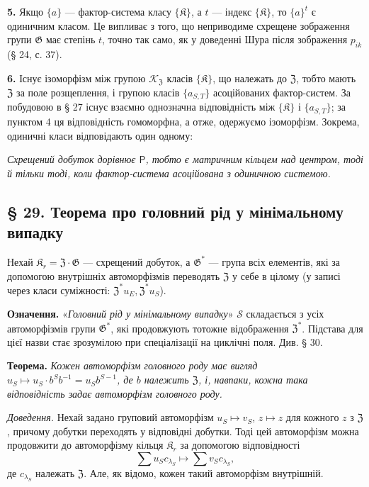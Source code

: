 \documentclass[11pt]{article}
\begin{document}
\noindent\textbf{5.} Якщо \(\{a\}\) --- фактор-система класу \(\{\mathfrak K\}\), а \(t\) --- індекс \(\{\mathfrak K\}\), то \(\{a\}^t\) є одиничним класом. Це випливає з того, що неприводиме схрещене зображення групи \(\mathfrak G\) має степінь \(t\), точно так само, як у доведенні Шура після зображення \(p_{ik}\) (§ 24, с. 37).

\noindent\textbf{6.} Існує ізоморфізм між групою \(\mathscr K_{\mathfrak Z}\) класів \(\{\mathfrak K\}\), що належать до \(\mathfrak Z\), тобто мають \(\mathfrak Z\) за поле розщеплення, і групою класів \(\{a_{S,T}\}\) асоційованих фактор-систем. За побудовою в § 27 існує взаємно однозначна відповідність між \(\{\mathfrak K\}\) і \(\{a_{S,T}\}\); за пунктом 4 ця відповідність гомоморфна, а отже, одержуємо ізоморфізм. Зокрема, одиничні класи відповідають один одному:

\noindent\emph{Схрещений добуток дорівнює \(\mathsf{P}\), тобто є матричним кільцем над центром, тоді й тільки тоді, коли фактор-система асоційована з одиничною системою.}

\subsection*{§ 29. Теорема про головний рід у мінімальному випадку}\label{hauptgeschlechtssatz-im-minimalen}

Нехай \(\mathfrak K_r=\mathfrak Z\cdot\mathfrak G\) --- схрещений добуток, а \(\mathfrak G^*\) --- група всіх елементів, які за допомогою внутрішніх автоморфізмів переводять \(\mathfrak Z\) у себе в цілому (у записі через класи суміжності: \(\mathfrak Z^*u_E,\mathfrak Z^*u_S\)).

\noindent\textbf{Означення.} «\emph{Головний рід у мінімальному випадку}» \(\mathscr S\) складається з усіх автоморфізмів групи \(\mathfrak G^*\), які продовжують тотожне відображення \(\mathfrak Z^*\). Підстава для цієї назви стає зрозумілою при спеціалізації на циклічні поля. Див. § 30.

\noindent\textbf{Теорема.} \emph{Кожен автоморфізм головного роду має вигляд \(u_S\mapsto u_S\cdot b^Sb^{-1}=u_Sb^{S-1}\), де \(b\) належить \(\mathfrak Z\), і, навпаки, кожна така відповідність задає автоморфізм головного роду.}

\noindent\emph{Доведення.} Нехай задано груповий автоморфізм \(u_S\mapsto v_S\), \(z\mapsto z\) для кожного \(z\) з \(\mathfrak Z\), причому добутки переходять у відповідні добутки. Тоді цей автоморфізм можна продовжити до автоморфізму кільця \(\mathfrak K_r\) за допомогою відповідності
\[
\sum u_Sc_{\lambda_S}\mapsto\sum v_Sc_{\lambda_S},
\]
де \(c_{\lambda_S}\) належать \(\mathfrak Z\). Але, як відомо, кожен такий автоморфізм внутрішній.
\end{document}
